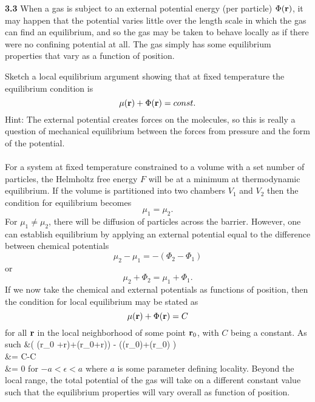 \documentclass[11pt,letterpaper]{article}
\begin{document}
		\phantom{}
		\phantom{}
		
	
	
	\item[\textbf{3.3}]
	When a gas is subject to an external potential energy (per particle) $\Phi(\mathbf{r})$, it may happen that the potential
	varies little over the length scale in which the gas can find an equilibrium, and so the gas may be taken to behave
	locally as if there were no confining potential at all. The gas simply has some equilibrium properties that vary as a 
	function of position.
	
	\benum
		\item
		Sketch a local equilibrium argument showing that at fixed temperature the equilibrium condition is
		\[
			\mu(\mathbf{r}) +\Phi(\mathbf{r}) = const.
		\]
		Hint: The external potential creates forces on the molecules, so this is really a question of mechanical equilibrium
		between the forces from pressure and the form of the potential. 
		\\
		\\
		For a system at fixed temperature constrained to a volume with a set number of particles, the Helmholtz free energy
		$F$ will be at a minimum at thermodynamic equilibrium. If the volume is partitioned into two chambers $V_1$ and $V_2$
		then the condition for equilibrium becomes
		\[
			\mu_1 = \mu_2. 
		\]
		For $\mu_1\ne \mu_2$, there will be diffusion of particles across the barrier. However, one can establish equilibrium by
		applying an external potential equal to the difference between chemical potentials
		\[
			\mu_2-\mu_1 = -(\Phi_2-\Phi_1)
		\]
		or
		\[	
			\mu_2+\Phi_2 = \mu_1+\Phi_1.
		\]
		If we now take the chemical and external potentials as functions of position, then the condition for 
		local equilibrium may be stated as
		\[
			\mu(\mathbf{r})+\Phi(\mathbf{r}) = C
		\]
		for all $\mathbf{r}$ in the local neighborhood of some point $\mathbf{r}_0$, with $C$ being a constant. As such
		\ba
			&\bigg( \mu(\vect r_0 +\epsilon\vecth r)+\Phi(\vect r_0+\epsilon\vecth r)\bigg)  - \bigg(\mu(\vect r_0)+\Phi(\vect r_0) \bigg)\\
			&= C-C \\
			&= 0
		\ea
		for $-a<\epsilon<a$ where $a$ is some parameter defining locality. Beyond the local range, the total potential of the gas will take 
		on a different constant value such that the equilibrium properties will vary overall as function of position. 
\end{document}
